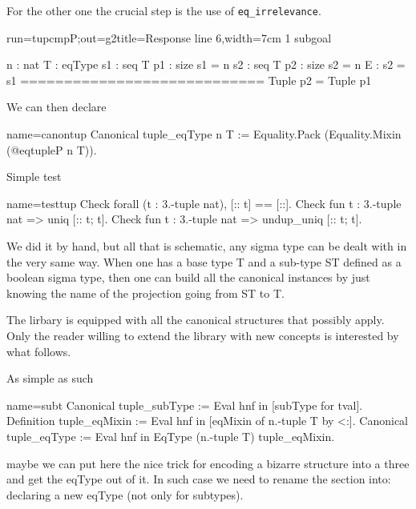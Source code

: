 For the other one the crucial step is the use
of \lstinline/eq_irrelevance/.

\begin{coqout}{run=tupcmpP;out=g2}{title=Response line 6,width=7cm}
1 subgoal

n : nat
T : eqType
s1 : seq T
p1 : size s1 = n
s2 : seq T
p2 : size s2 = n
E : s2 = s1
============================
Tuple p2 = Tuple p1
\end{coqout}

We can then declare

\begin{coq}{name=canontup}{}
Canonical tuple_eqType n T :=
  Equality.Pack (Equality.Mixin (@eqtupleP n T)).
\end{coq}

Simple test

\begin{coq}{name=testtup}{}
Check forall (t : 3.-tuple nat), [:: t] == [::].
Check fun t : 3.-tuple nat => uniq [:: t; t].
Check fun t : 3.-tuple nat => undup_uniq [:: t; t].
\end{coq}

We did it by hand, but all that is schematic, any sigma type can be
dealt with in the very same way.  When one has a base type T and a
sub-type ST defined as a boolean sigma type, then one can build all
the canonical instances by just knowing the name of the projection
going from ST to T.

The lirbary is equipped with all the canonical structures that
possibly apply.  Only the reader willing to extend the library with
new concepts is interested by what follows.

\mcbREQUIRE{}

As simple as such

\begin{coq}{name=subt}{}
Canonical tuple_subType := Eval hnf in [subType for tval].
Definition tuple_eqMixin := Eval hnf in [eqMixin of n.-tuple T by <:].
Canonical tuple_eqType := Eval hnf in EqType (n.-tuple T) tuple_eqMixin.
\end{coq}

maybe we can put here the nice trick for encoding a bizarre structure
into a three and get the eqType out of it.  In such case we need to
rename the section into: declaring a new eqType (not only for
subtypes).

